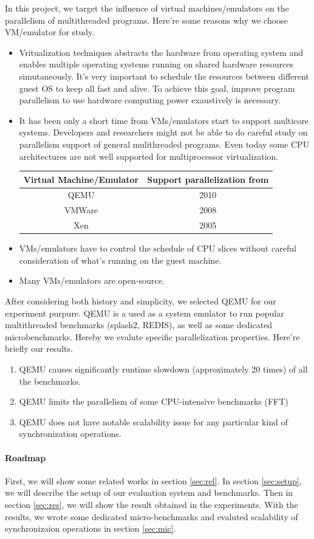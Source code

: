 In this project, we target the influence of virtual machines/emulators on 
the parallelism of multithreaded programs. Here're some reasons why we choose
VM/emulator for study.
\begin{itemize}
\item Vritualization techniques abstracts the hardware from operating system 
and enables multiple operating systems running on shared hardware resources
simutaneously. It's very important to schedule the resources between different
guest OS to keep all fast and alive. To achieve this goal, improve program 
parallelism to use hardware computing power exaustively is necessary.
\item It has been only a short time from VMs/emulators start to support multicore
systems. Developers and researchers might not be able to do careful study 
on parallelism support of general mulithreaded programs. Even today some 
CPU architectures are not well supported for multiprocessor virtualization.
\begin{table}
\center
\begin{tabular}{c|c}
Virtual Machine/Emulator & Support parallelization from \\
\hline
QEMU & 2010\cite{rel:qemuwiki} \\
VMWare & 2008\cite{rel:vm55} \\
Xen & 2005\cite{rel:xenpar}\cite{rel:xen} 
\end{tabular}
\end{table}
\item VMs/emulators have to control the schedule of CPU slices 
without careful consideration of what's running on the guest machine. 
\item Many VMs/emulators are open-source.
\end{itemize}

After considering both history and simplicity, we selected QEMU for our 
experiment purpure. QEMU is a used as a system emulator to run popular 
multithreaded benchmarks
(splash2, REDIS), as well as some dedicated microbenchmarks. Hereby we evalute 
specific parallelization properties. Here're briefly our results. 

\begin{enumerate}
\item QEMU causes significantly runtime slowdown (approximately 20 times) of all
the benchmarks.
\item QEMU limits the parallelism of some CPU-intensive benchmarks (FFT)
\item QEMU does not have notable scalability issue for any particular kind of 
synchronization operations. 
\end{enumerate}

\paragraph{Roadmap} First, we will show some related works in section 
\ref{sec:rel}. In section \ref{sec:setup}, we will describe the setup of 
our evaluation system and benchmarks. Then in section \ref{sec:res}, we will 
show the result obtained in the experiments. With the results, we wrote some 
dedicated micro-benchmarks and evaluted scalability of synchronizaion operations
in section \ref{sec:mic}.
